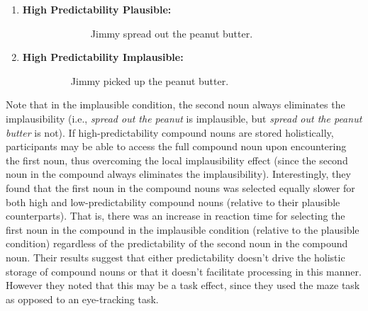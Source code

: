 \documentclass[
  man,floatsintext]{apa6}
\begin{document}
\begin{enumerate}
\def\labelenumi{\arabic{enumi}.}
\item
  \begin{description}
  \item[\textbf{High Predictability Plausible:}]
  ~~~~~~~~Jimmy spread out the peanut butter.
  \end{description}
\item
  \begin{description}
  \item[\textbf{High Predictability Implausible:}]
  ~~~~Jimmy picked up the peanut butter.
  \end{description}
\end{enumerate}

\noindent Note that in the implausible condition, the second noun always eliminates the implausibility (i.e., \emph{spread out the peanut} is implausible, but \emph{spread out the peanut butter} is not). If high-predictability compound nouns are stored holistically, participants may be able to access the full compound noun upon encountering the first noun, thus overcoming the local implausibility effect (since the second noun in the compound always eliminates the implausibility). Interestingly, they found that the first noun in the compound nouns was selected equally slower for both high and low-predictability compound nouns (relative to their plausible counterparts). That is, there was an increase in reaction time for selecting the first noun in the compound in the implausible condition (relative to the plausible condition) regardless of the predictability of the second noun in the compound noun. Their results suggest that either predictability doesn't drive the holistic storage of compound nouns or that it doesn't facilitate processing in this manner. However they noted that this may be a task effect, since they used the maze task as opposed to an eye-tracking task.
\end{document}
